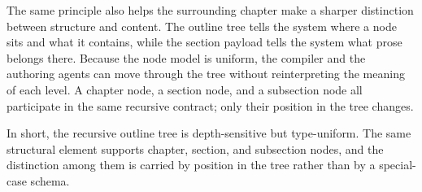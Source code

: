 \documentclass[11pt]{article}
\begin{document}
The same principle also helps the surrounding chapter make a sharper distinction between structure and content. The outline tree tells the system where a node sits and what it contains, while the section payload tells the system what prose belongs there. Because the node model is uniform, the compiler and the authoring agents can move through the tree without reinterpreting the meaning of each level. A chapter node, a section node, and a subsection node all participate in the same recursive contract; only their position in the tree changes.

In short, the recursive outline tree is depth-sensitive but type-uniform. The same structural element supports chapter, section, and subsection nodes, and the distinction among them is carried by position in the tree rather than by a special-case schema.
\end{document}
